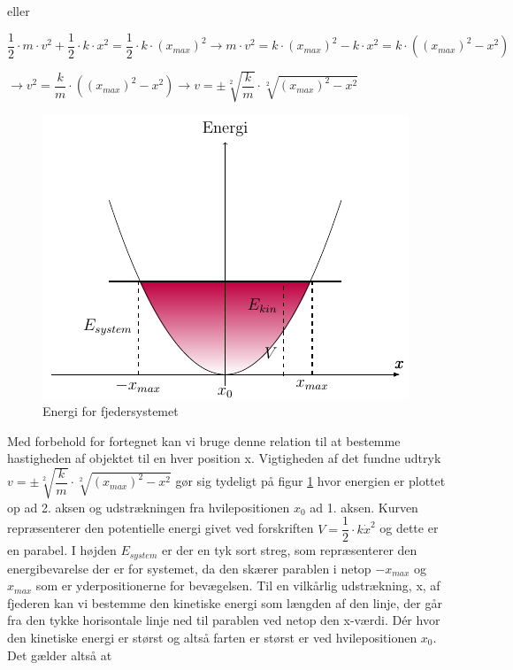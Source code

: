 eller 

\bigskip
\begin{center}
$\dfrac{1}{2} \cdot m \cdot v^2 + \dfrac{1}{2} \cdot k \cdot x^2 = \dfrac{1}{2} \cdot k \cdot (x_{max})^2 \rightarrow m \cdot v^2 = k \cdot (x_{max})^2 - k \cdot x^2 = k \cdot ((x_{max})^2 - x^2)$

$\rightarrow v^2 = \dfrac{k}{m} \cdot ((x_{max})^2 - x^2) \rightarrow v = \pm \sqrt[2]{\dfrac{k}{m}} \cdot \sqrt[2]{(x_{max})^2-x^2}$
\end{center}
\bigskip

\begin{figure}
\begin{center}
\includegraphics[scale=0.8]{Billeder/parabel}
\end{center}
\caption{Energi for fjedersystemet \label{fig:parabel}}
\end{figure} 

Med forbehold for fortegnet kan vi bruge denne relation til at bestemme hastigheden af objektet til en hver position x. Vigtigheden af det fundne udtryk $v = \pm \sqrt[2]{\dfrac{k}{m}} \cdot \sqrt[2]{(x_{max})^2-x^2}$ gør sig tydeligt på figur   \ref{fig:parabel} hvor energien er plottet op ad 2. aksen og udstrækningen fra hvilepositionen $x_0$ ad 1. aksen. Kurven repræsenterer den potentielle energi givet ved forskriften $V=\dfrac{1}{2} \cdot k \dot x^2$ og dette er en parabel. I højden $E_{system}$ er der en tyk sort streg, som repræsenterer den energibevarelse der er for systemet, da den skærer parablen i netop $-x_{max}$ og $x_{max}$ som er yderpositionerne for bevægelsen. Til en vilkårlig udstrækning, x, af fjederen kan vi bestemme den kinetiske energi som længden af den linje, der går fra den tykke horisontale linje ned til parablen ved netop den x-værdi. Dér hvor den kinetiske energi er størst og altså farten er størst er ved hvilepositionen $x_0$. Det gælder altså at

